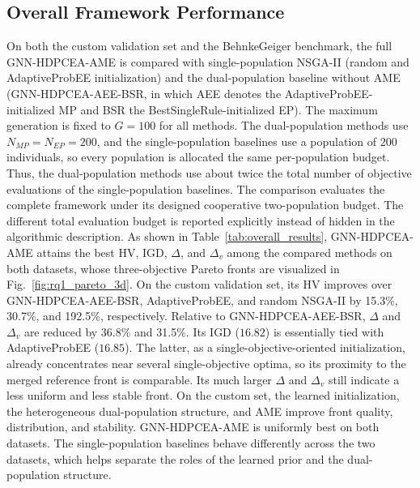 \documentclass[pdflatex,iicol,Numbered,sn-basic]{sn-jnl}
\begin{document}
\subsection{Overall Framework Performance}\label{subsec:rq1}
On both the custom validation set and the BehnkeGeiger benchmark, the full GNN-HDPCEA-AME is compared with single-population NSGA-II (random and AdaptiveProbEE initialization) and the dual-population baseline without AME (GNN-HDPCEA-AEE-BSR, in which AEE denotes the AdaptiveProbEE-initialized MP and BSR the BestSingleRule-initialized EP).
The maximum generation is fixed to $G=100$ for all methods. The dual-population methods use $N_{MP}=N_{EP}=200$, and the single-population baselines use a population of $200$ individuals, so every population is allocated the same per-population budget.
Thus, the dual-population methods use about twice the total number of objective evaluations of the single-population baselines. The comparison evaluates the complete framework under its designed cooperative two-population budget. The different total evaluation budget is reported explicitly instead of hidden in the algorithmic description.
As shown in Table~\ref{tab:overall_results}, GNN-HDPCEA-AME attains the best HV, IGD, $\Delta$, and $\Delta_v$ among the compared methods on both datasets, whose three-objective Pareto fronts are visualized in Fig.~\ref{fig:rq1_pareto_3d}.
On the custom validation set, its HV improves over GNN-HDPCEA-AEE-BSR, AdaptiveProbEE, and random NSGA-II by 15.3\%, 30.7\%, and 192.5\%, respectively. Relative to GNN-HDPCEA-AEE-BSR, $\Delta$ and $\Delta_v$ are reduced by 36.8\% and 31.5\%.
Its IGD ($16.82$) is essentially tied with AdaptiveProbEE ($16.85$). The latter, as a single-objective-oriented initialization, already concentrates near several single-objective optima, so its proximity to the merged reference front is comparable. Its much larger $\Delta$ and $\Delta_v$ still indicate a less uniform and less stable front.
On the custom set, the learned initialization, the heterogeneous dual-population structure, and AME improve front quality, distribution, and stability.
GNN-HDPCEA-AME is uniformly best on both datasets. The single-population baselines behave differently across the two datasets, which helps separate the roles of the learned prior and the dual-population structure.
\end{document}
